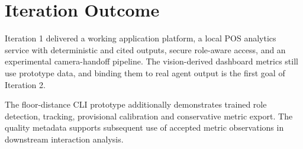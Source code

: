 \section{Iteration Outcome}
Iteration 1 delivered a working application platform, a local POS analytics service with deterministic and cited outputs, secure role-aware access, and an experimental camera-handoff pipeline. The vision-derived dashboard metrics still use prototype data, and binding them to real agent output is the first goal of Iteration 2.

The floor-distance CLI prototype additionally demonstrates trained role detection, tracking, provisional calibration and conservative metric export. The quality metadata supports subsequent use of accepted metric observations in downstream interaction analysis.
